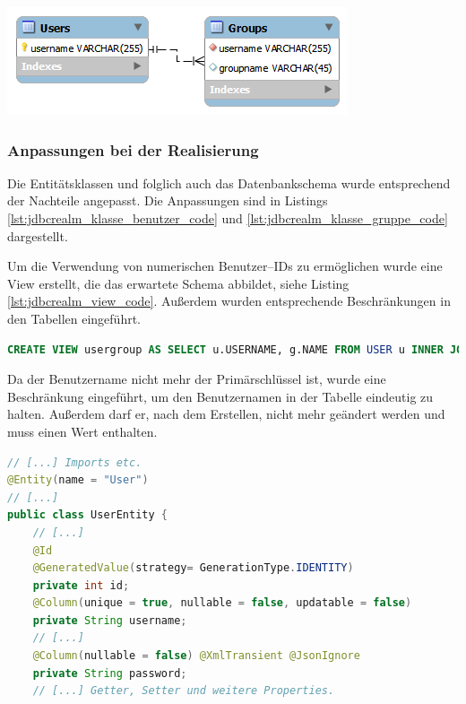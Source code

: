 \begin{minipage}[t]{\textwidth}
	\centering
	\includegraphics[scale = .75]{img/jdbcrealm_schema}
	\label{fig:jdbcrealm_minimal_schema}
\end{minipage}

\subsubsection{Anpassungen bei der Realisierung}

Die Entitätsklassen und folglich auch das Datenbankschema wurde entsprechend der Nachteile angepasst.
Die Anpassungen sind in Listings \ref{lst:jdbcrealm_klasse_benutzer_code} und \ref{lst:jdbcrealm_klasse_gruppe_code} dargestellt.

Um die Verwendung von numerischen Benutzer--IDs zu ermöglichen wurde eine View erstellt, die das erwartete Schema abbildet, siehe Listing \ref{lst:jdbcrealm_view_code}.
Außerdem wurden entsprechende Beschränkungen in den Tabellen eingeführt.
\begin{lstlisting}[language=SQL,caption={SQL Befehl zum erstellen einer View mit Benutzername und Gruppenname}, label=lst:jdbcrealm_view_code]
CREATE VIEW usergroup AS SELECT u.USERNAME, g.NAME FROM USER u INNER JOIN realmgroup g on g.USER_ID = u.ID;
\end{lstlisting}

Da der Benutzername nicht mehr der Primärschlüssel ist, wurde eine Beschränkung eingeführt, um den Benutzernamen in der Tabelle eindeutig zu halten.
Außerdem darf er, nach dem Erstellen, nicht mehr geändert werden und muss einen Wert enthalten.
\begin{lstlisting}[language=Java,caption={Beispiel für eine UserEntity Klasse.}, label=lst:jdbcrealm_klasse_benutzer_code]
// [...] Imports etc.
@Entity(name = "User")
// [...]
public class UserEntity {
	// [...]
    @Id
    @GeneratedValue(strategy= GenerationType.IDENTITY)
    private int id;
    @Column(unique = true, nullable = false, updatable = false)
    private String username;
    // [...]
    @Column(nullable = false) @XmlTransient @JsonIgnore
    private String password;
    // [...] Getter, Setter und weitere Properties.
\end{lstlisting}

